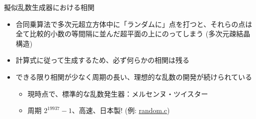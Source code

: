 \begin{frame}[t,fragile]{擬似乱数生成器における相関}
  \begin{itemize}
  \item 合同乗算法で多次元超立方体中に「ランダムに」点を打つと、それらの点は全て比較的小数の等間隔に並んだ超平面の上にのってしまう (多次元疎結晶構造)

    
  \item 計算式に従って生成するため、必ず何らかの相関は残る
  \item できる限り相関が少なく周期の長い、理想的な乱数の開発が続けられている
    \begin{itemize}
    \item 現時点で、標準的な乱数発生器：メルセンヌ・ツイスター
    \item 周期 $2^{19937}-1$、高速、日本製! (例: \href{https://github.com/todo-group/computer-experiments/blob/master/exercise/monte_carlo/random.c}{random.c})
    \end{itemize}
  \end{itemize}
\end{frame}
